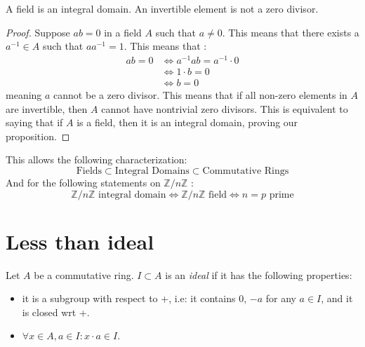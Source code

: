 \begin{theorem*}
  A field is an integral domain. An invertible element is not a zero divisor. 
\end{theorem*}
\begin{proof}
  Suppose $ab = 0$ in a field $A$ such that $a \neq 0$. This means that there exists a $a^{-1} \in A$ such that $aa^{-1} = 1$. This means that :
  \begin{align}
    ab = 0 
    &\Leftrightarrow a^{-1}ab = a^{-1} \cdot 0 \\
    &\Leftrightarrow 1 \cdot b = 0 \\
    &\Leftrightarrow b = 0
  \end{align}
  meaning $a$ cannot be a zero divisor. This means that if all non-zero elements in $A$ are invertible, then $A$ cannot have nontrivial zero divisors. This is equivalent to saying that if $A$ is a field, then it is an integral domain, proving our proposition.
\end{proof}

This allows the following characterization: 
\[
  \text{Fields} \subset \text{Integral Domains} \subset \text{Commutative Rings}
\]
And for the following statements on $\mathbb{Z}/n\mathbb{Z}$ : 
\[
  \mathbb{Z}/n\mathbb{Z} \text{ integral domain} \Leftrightarrow \mathbb{Z}/n\mathbb{Z} \text{ field} \Leftrightarrow n = p \text{ prime}
\]

\section{Less than ideal}

\begin{definition}
  Let $A$ be a commutative ring. $I \subset A$ is an \emph{ideal} if it has the following properties:
  \begin{itemize}
    \item it is a subgroup with respect to +, i.e: it contains 0, $-a$ for any $a \in I$, and it is closed wrt +. 
    \item $\forall x \in A, a \in I: x \cdot a \in I$. 
  \end{itemize}
\end{definition}


